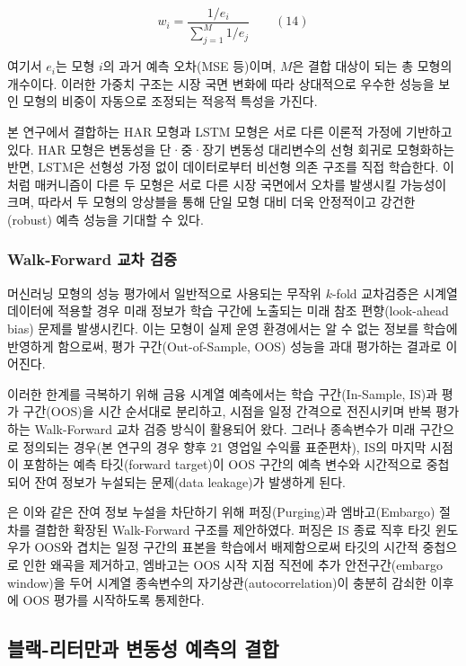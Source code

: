 \documentclass{article}
\begin{document}
\begin{equation}
w_i = \frac{1/e_i}{\sum_{j=1}^{M} 1/e_j} \qquad(14)\end{equation}

여기서 $e_i$는 모형 $i$의 과거 예측 오차(MSE 등)이며, $M$은 결합 대상이 되는 총 모형의 개수이다. 이러한 가중치 구조는 시장 국면 변화에 따라 상대적으로 우수한 성능을 보인 모형의 비중이 자동으로 조정되는 적응적 특성을 가진다.

본 연구에서 결합하는 HAR 모형과 LSTM 모형은 서로 다른 이론적 가정에 기반하고 있다. HAR 모형은 변동성을 단·중·장기 변동성 대리변수의 선형 회귀로 모형화하는 반면, LSTM은 선형성 가정 없이 데이터로부터 비선형 의존 구조를 직접 학습한다. 이처럼 매커니즘이 다른 두 모형은 서로 다른 시장 국면에서 오차를 발생시킬 가능성이 크며, 따라서 두 모형의 앙상블을 통해 단일 모형 대비 더욱 안정적이고 강건한(robust) 예측 성능을 기대할 수 있다.

\subsubsection{Walk-Forward 교차 검증}
\label{subsubsec:walk_forward_review}

머신러닝 모형의 성능 평가에서 일반적으로 사용되는 무작위 $k$-fold 교차검증은 시계열 데이터에 적용할 경우 미래 정보가 학습 구간에 노출되는 미래 참조 편향(look-ahead bias) 문제를 발생시킨다. 이는 모형이 실제 운영 환경에서는 알 수 없는 정보를 학습에 반영하게 함으로써, 평가 구간(Out-of-Sample, OOS) 성능을 과대 평가하는 결과로 이어진다.

이러한 한계를 극복하기 위해 금융 시계열 예측에서는 학습 구간(In-Sample, IS)과 평가 구간(OOS)을 시간 순서대로 분리하고, 시점을 일정 간격으로 전진시키며 반복 평가하는 Walk-Forward 교차 검증 방식이 활용되어 왔다. 그러나 종속변수가 미래 구간으로 정의되는 경우(본 연구의 경우 향후 21 영업일 수익률 표준편차), IS의 마지막 시점이 포함하는 예측 타깃(forward target)이 OOS 구간의 예측 변수와 시간적으로 중첩되어 잔여 정보가 누설되는 문제(data leakage)가 발생하게 된다.

\citet{lopezdeprado2018}은 이와 같은 잔여 정보 누설을 차단하기 위해 퍼징(Purging)과 엠바고(Embargo) 절차를 결합한 확장된 Walk-Forward 구조를 제안하였다. 퍼징은 IS 종료 직후 타깃 윈도우가 OOS와 겹치는 일정 구간의 표본을 학습에서 배제함으로써 타깃의 시간적 중첩으로 인한 왜곡을 제거하고, 엠바고는 OOS 시작 지점 직전에 추가 안전구간(embargo window)을 두어 시계열 종속변수의 자기상관(autocorrelation)이 충분히 감쇠한 이후에 OOS 평가를 시작하도록 통제한다.

\subsection{블랙-리터만과 변동성 예측의 결합}
\label{subsec:bl_vol_review}
\end{document}
